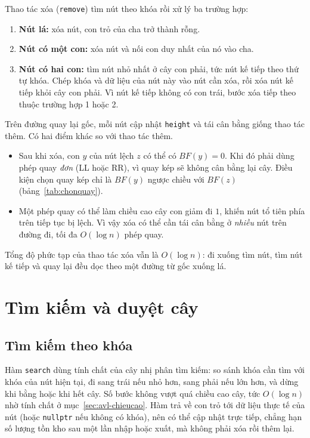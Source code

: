 Thao tác xóa (\texttt{remove}) tìm nút theo khóa rồi xử lý ba trường hợp:
\begin{enumerate}
  \item \textbf{Nút lá:} xóa nút, con trỏ của cha trở thành rỗng.
  \item \textbf{Nút có một con:} xóa nút và nối con duy nhất của nó vào cha.
  \item \textbf{Nút có hai con:} tìm nút nhỏ nhất ở cây con phải, tức nút kế tiếp
        theo thứ tự khóa. Chép khóa và dữ liệu của nút này vào nút cần xóa, rồi
        xóa nút kế tiếp khỏi cây con phải. Vì nút kế tiếp không có con trái, bước
        xóa tiếp theo thuộc trường hợp 1 hoặc 2.
\end{enumerate}
Trên đường quay lại gốc, mỗi nút cập nhật \texttt{height} và tái cân bằng giống
thao tác thêm. Có hai điểm khác so với thao tác thêm.
\begin{itemize}
  \item Sau khi xóa, con $y$ của nút lệch $z$ có thể có $BF(y) = 0$. Khi đó phải
        dùng phép quay \emph{đơn} (LL hoặc RR), vì quay kép sẽ không cân bằng lại
        cây. Điều kiện chọn quay kép chỉ là $BF(y)$ ngược chiều với $BF(z)$
        (bảng~\ref{tab:chonquay}).
  \item Một phép quay có thể làm chiều cao cây con giảm đi $1$, khiến nút tổ tiên
        phía trên tiếp tục bị lệch. Vì vậy xóa có thể cần tái cân bằng ở
        \emph{nhiều} nút trên đường đi, tối đa $O(\log n)$ phép quay.
\end{itemize}
Tổng độ phức tạp của thao tác xóa vẫn là $O(\log n)$: đi xuống tìm nút, tìm nút kế
tiếp và quay lại đều dọc theo một đường từ gốc xuống lá.

\section{Tìm kiếm và duyệt cây}\label{sec:avl-timkiem}

\subsection{Tìm kiếm theo khóa}

Hàm \texttt{search} dùng tính chất của cây nhị phân tìm kiếm: so sánh khóa cần tìm
với khóa của nút hiện tại, đi sang trái nếu nhỏ hơn, sang phải nếu lớn hơn, và
dừng khi bằng hoặc khi hết cây. Số bước không vượt quá chiều cao cây, tức
$O(\log n)$ nhờ tính chất ở mục~\ref{sec:avl-chieucao}. Hàm trả về con trỏ tới
dữ liệu thực tế của nút (hoặc \texttt{nullptr} nếu không có khóa), nên có thể cập
nhật trực tiếp, chẳng hạn số lượng tồn kho sau một lần nhập hoặc xuất, mà không
phải xóa rồi thêm lại.

